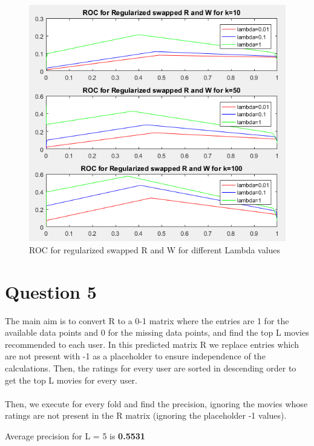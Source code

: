 \documentclass[12pt, onecolumn]{IEEEtran}
\begin{document}
\begin{figure}[h!]
\centering
\captionsetup{justification=centering}
\includegraphics[scale=0.82]{Graphs/swapped}
\caption{ROC for regularized swapped R and W for different Lambda values}
\end{figure}

\newpage
\section*{Question 5}
The main aim is to convert R to a 0-1 matrix where the entries are 1 for the available data points and 0 for the missing data points, and find the top L movies recommended to each user. In this predicted matrix R we replace entries which are not present with -1 as a placeholder to ensure independence of the calculations. Then, the ratings for every user are sorted in descending order to get the top L movies for every user.
\\\\
Then, we execute for every fold and find the precision, ignoring the movies whose ratings are not present in the R matrix (ignoring the placeholder -1 values).
\begin{center}
	Average precision for L = 5 is \textbf{0.5531}
\end{center}
\end{document}
